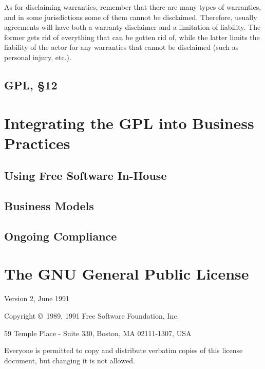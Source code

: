 \documentclass[12pt]{report}
\begin{document}
As for disclaiming warranties, remember that there are many types of
warranties, and in some jurisdictions some of them cannot be disclaimed.
Therefore, usually agreements will have both a warranty disclaimer and a
limitation of liability.  The former gets rid of everything that can be
gotten rid of, while the latter limits the liability of the actor for any
warranties that cannot be disclaimed (such as personal injury, etc.).

\section{GPL, \S 12}
\label{GPLs12}

\chapter{Integrating the GPL into Business Practices}

\section{Using Free Software In-House}

\section{Business Models}
\label{Business Models}

\section{Ongoing Compliance}

\appendix

\chapter{The GNU General Public License}

\begin{center}
{\parindent 0in

Version 2, June 1991

Copyright \copyright\ 1989, 1991 Free Software Foundation, Inc.

\bigskip

59 Temple Place - Suite 330, Boston, MA  02111-1307, USA

\bigskip

Everyone is permitted to copy and distribute verbatim copies
of this license document, but changing it is not allowed.
}
\end{center}
\end{document}
